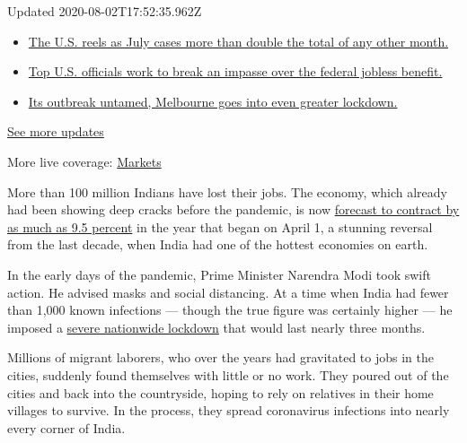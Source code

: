 Updated 2020-08-02T17:52:35.962Z

\begin{itemize}
\tightlist
\item
  \href{https://www.nytimes.com/2020/08/01/world/coronavirus-covid-19.html?action=click\&pgtype=Article\&state=default\&region=MAIN_CONTENT_1\&context=storylines_live_updates\#link-34047410}{The
  U.S. reels as July cases more than double the total of any other
  month.}
\item
  \href{https://www.nytimes.com/2020/08/01/world/coronavirus-covid-19.html?action=click\&pgtype=Article\&state=default\&region=MAIN_CONTENT_1\&context=storylines_live_updates\#link-780ec966}{Top
  U.S. officials work to break an impasse over the federal jobless
  benefit.}
\item
  \href{https://www.nytimes.com/2020/08/01/world/coronavirus-covid-19.html?action=click\&pgtype=Article\&state=default\&region=MAIN_CONTENT_1\&context=storylines_live_updates\#link-2bc8948}{Its
  outbreak untamed, Melbourne goes into even greater lockdown.}
\end{itemize}

\href{https://www.nytimes.com/2020/08/01/world/coronavirus-covid-19.html?action=click\&pgtype=Article\&state=default\&region=MAIN_CONTENT_1\&context=storylines_live_updates}{See
more updates}

More live coverage:
\href{https://www.nytimes.com/live/2020/07/31/business/stock-market-today-coronavirus?action=click\&pgtype=Article\&state=default\&region=MAIN_CONTENT_1\&context=storylines_live_updates}{Markets}

More than 100 million Indians have lost their jobs. The economy, which
already had been showing deep cracks before the pandemic, is now
\href{https://www.bloombergquint.com/business/icra-sees-india-real-gdp-contract-by-almost-double-digits-in-fy21}{forecast
to contract by as much as 9.5 percent} in the year that began on April
1, a stunning reversal from the last decade, when India had one of the
hottest economies on earth.

In the early days of the pandemic, Prime Minister Narendra Modi took
swift action. He advised masks and social distancing. At a time when
India had fewer than 1,000 known infections --- though the true figure
was certainly higher --- he imposed a
\href{https://www.nytimes.com/2020/03/24/world/asia/india-coronavirus-lockdown.html}{severe
nationwide lockdown} that would last nearly three months.

Millions of migrant laborers, who over the years had gravitated to jobs
in the cities, suddenly found themselves with little or no work. They
poured out of the cities and back into the countryside, hoping to rely
on relatives in their home villages to survive. In the process, they
spread coronavirus infections into nearly every corner of India.

